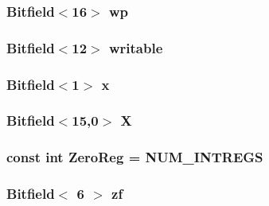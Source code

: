 \label{namespaceX86ISA_ad0682dae36178efd9d37d2734c608898}
\hypertarget{namespaceX86ISA_a19a8faa204e13d1459955bbbd47eb9b0}{
\subsubsection[{wp}]{\setlength{\rightskip}{0pt plus 5cm}Bitfield$<$16$>$ {\bf wp}}}
\label{namespaceX86ISA_a19a8faa204e13d1459955bbbd47eb9b0}
\hypertarget{namespaceX86ISA_a5a2b9e3f7c7a12080c9d48e67f540c98}{
\subsubsection[{writable}]{\setlength{\rightskip}{0pt plus 5cm}Bitfield$<$12$>$ {\bf writable}}}
\label{namespaceX86ISA_a5a2b9e3f7c7a12080c9d48e67f540c98}
\hypertarget{namespaceX86ISA_ab5f9a01fc40e47853ae9551b008afcbd}{
\subsubsection[{x}]{\setlength{\rightskip}{0pt plus 5cm}Bitfield$<$1$>$ {\bf x}}}
\label{namespaceX86ISA_ab5f9a01fc40e47853ae9551b008afcbd}
\hypertarget{namespaceX86ISA_a8c8da34a185dfa074d1b9976b7ce7a93}{
\subsubsection[{X}]{\setlength{\rightskip}{0pt plus 5cm}Bitfield$<$15,0$>$ {\bf X}}}
\label{namespaceX86ISA_a8c8da34a185dfa074d1b9976b7ce7a93}
\hypertarget{namespaceX86ISA_a33dbba4a12f6733a5ecc2d2b3542b7ee}{
\subsubsection[{ZeroReg}]{\setlength{\rightskip}{0pt plus 5cm}const int {\bf ZeroReg} = NUM\_\-INTREGS}}
\label{namespaceX86ISA_a33dbba4a12f6733a5ecc2d2b3542b7ee}
\hypertarget{namespaceX86ISA_a4e065baa40115a9e97f678b00ab6e331}{
\subsubsection[{zf}]{\setlength{\rightskip}{0pt plus 5cm}Bitfield$<$ 6 $>$ {\bf zf}}}
\label{namespaceX86ISA_a4e065baa40115a9e97f678b00ab6e331}
